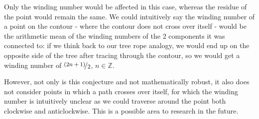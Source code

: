 \documentclass[a4paper]{article}
\def\nicefrac#1#2{%
    \raise.5ex\hbox{\begin{footnotesize}$#1$\end{footnotesize}}%
    \kern-.15em/\kern-.035em%
    \lower.25ex\hbox{\begin{footnotesize}$#2$\end{footnotesize}}}
\begin{document}
Only the winding number would be affected in this case, whereas the residue of the point would remain the same. We could intuitively say the winding number of a point on the contour - where the contour does not cross over itself - would be the arithmetic mean of the winding numbers of the 2 components it was connected to: if we think back to our tree rope analogy, we would end up on the opposite side of the tree after tracing through the contour, so we would get a winding number of $\nicefrac{(2n+1)}{2 }$, $n \in \mathbb{Z}$. 

However, not only is this conjecture and not mathematically robust, it also does not consider points in which a path crosses over itself, for which the winding number is intuitively unclear as we could traverse around the point both clockwise and anticlockwise. This is a possible area to research in the future.


\pagebreak

\end{document}
